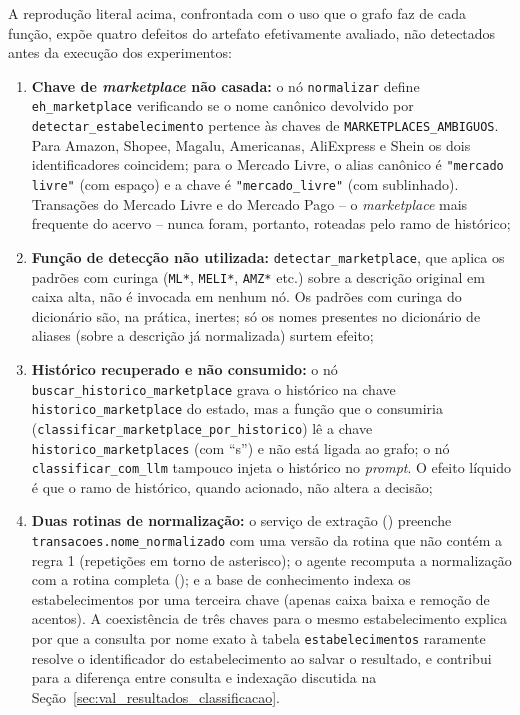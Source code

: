 \begin{apendicesenv}
A reprodução literal acima, confrontada com o uso que o grafo faz de cada função, expõe quatro defeitos do artefato efetivamente avaliado, não detectados antes da execução dos experimentos:
\begin{enumerate}
	\item \textbf{Chave de \textit{marketplace} não casada:} o nó \texttt{normalizar} define \texttt{eh\_marketplace} verificando se o nome canônico devolvido por \texttt{detectar\_estabelecimento} pertence às chaves de \texttt{MARKETPLACES\_AMBIGUOS}. Para Amazon, Shopee, Magalu, Americanas, AliExpress e Shein os dois identificadores coincidem; para o Mercado Livre, o alias canônico é \texttt{"mercado livre"} (com espaço) e a chave é \texttt{"mercado\_livre"} (com sublinhado). Transações do Mercado Livre e do Mercado Pago -- o \textit{marketplace} mais frequente do acervo -- nunca foram, portanto, roteadas pelo ramo de histórico;
	\item \textbf{Função de detecção não utilizada:} \texttt{detectar\_marketplace}, que aplica os padrões com curinga (\texttt{ML*}, \texttt{MELI*}, \texttt{AMZ*} etc.) sobre a descrição original em caixa alta, não é invocada em nenhum nó. Os padrões com curinga do dicionário são, na prática, inertes; só os nomes presentes no dicionário de aliases (sobre a descrição já normalizada) surtem efeito;
	\item \textbf{Histórico recuperado e não consumido:} o nó \texttt{buscar\_historico\_marketplace} grava o histórico na chave \texttt{historico\_marketplace} do estado, mas a função que o consumiria (\texttt{classificar\_marketplace\_por\_historico}) lê a chave \texttt{historico\_marketplaces} (com ``s'') e não está ligada ao grafo; o nó \texttt{classificar\_com\_llm} tampouco injeta o histórico no \textit{prompt}. O efeito líquido é que o ramo de histórico, quando acionado, não altera a decisão;
	\item \textbf{Duas rotinas de normalização:} o serviço de extração () preenche \texttt{transacoes.nome\_normalizado} com uma versão da rotina que não contém a regra 1 (repetições em torno de asterisco); o agente recomputa a normalização com a rotina completa (); e a base de conhecimento indexa os estabelecimentos por uma terceira chave (apenas caixa baixa e remoção de acentos). A coexistência de três chaves para o mesmo estabelecimento explica por que a consulta por nome exato à tabela \texttt{estabelecimentos} raramente resolve o identificador do estabelecimento ao salvar o resultado, e contribui para a diferença entre consulta e indexação discutida na Seção~\ref{sec:val_resultados_classificacao}.
\end{enumerate}


\end{apendicesenv}
